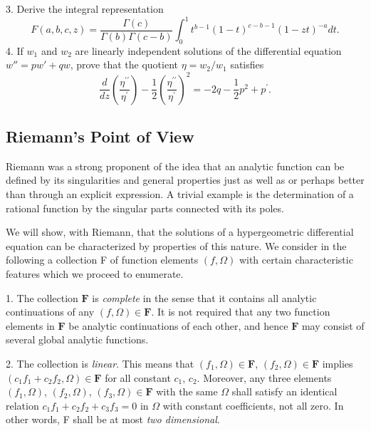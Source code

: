 3. Derive the integral representation
\begin{equation*}
F (a, b, c, z) = \frac {\Gamma (c)}{\Gamma (b) \Gamma (c - b)} \int_ {0} ^ {1} t ^ {b - 1} (1 - t) ^ {c - b - 1} (1 - z t) ^ {- a} d t.
\end{equation*}
4. If $w_{1}$ and $w_{2}$ are linearly independent solutions of the differential equation $w'' = pw' + qw$, prove that the quotient $\eta = w_{2}/w_{1}$ satisfies
\begin{equation*}
\frac {d}{d z} \left(\frac {\eta^ {\prime \prime}}{\eta^ {\prime}}\right) - \frac {1}{2} \left(\frac {\eta^ {\prime \prime}}{\eta^ {\prime}}\right) ^ {2} = - 2 q - \frac {1}{2} p ^ {2} + p ^ {\prime}.
\end{equation*}
\setcounter{section}{4}\setcounter{subsection}{4}\subsection{Riemann's Point of View}\label{sec:8.4.5}
Riemann was a strong proponent of the idea that an analytic function can be defined by its singularities and general properties just as well as or perhaps better than through an explicit expression. A trivial example is the determination of a rational function by the singular parts connected with its poles.

We will show, with Riemann, that the solutions of a hypergeometric differential equation can be characterized by properties of this nature. We consider in the following a collection F of function elements $(f,\Omega)$ with certain characteristic features which we proceed to enumerate.

1. The collection $\mathbf{F}$ is \emph{complete} in the sense that it contains all analytic continuations of any $(f,\Omega)\in\mathbf{F}$. It is not required that any two function elements in $\mathbf{F}$ be analytic continuations of each other, and hence $\mathbf{F}$ may consist of several global analytic functions.

2. The collection is \emph{linear}. This means that $(f_{1},\Omega)\in\mathbf{F}$, $(f_{2},\Omega)\in\mathbf{F}$ implies $(c_{1}f_{1}+c_{2}f_{2},\Omega)\in\mathbf{F}$ for all constant $c_{1}$, $c_{2}$. Moreover, any three elements $(f_{1},\Omega)$, $(f_{2},\Omega)$, $(f_{3},\Omega)\in\mathbf{F}$ with the same $\Omega$ shall satisfy an identical relation $c_{1}f_{1}+c_{2}f_{2}+c_{3}f_{3}=0$ in $\Omega$ with constant coefficients, not all zero. In other words, F shall be at most \emph{two dimensional}.

